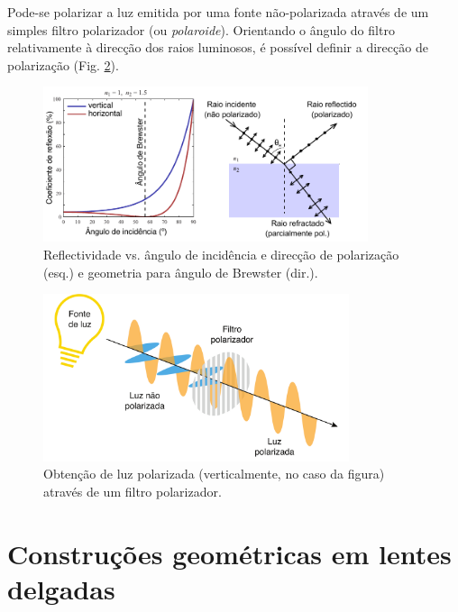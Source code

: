 \documentclass[a4paper,twoside,11pt]{report}      %
\begin{document}
Pode-se polarizar a luz emitida por uma fonte não-polarizada através de um simples filtro polarizador (ou \textit{polaroide}). Orientando o ângulo do filtro relativamente à direcção dos raios luminosos, é possível definir a direcção de polarização (Fig. \ref{fig:pol-luz}).

\begin{figure}[h]
\begin{center}
	\includegraphics[width=0.85\textwidth]{2-brewster}
	\caption{Reflectividade vs. ângulo de incidência e direcção de polarização (esq.) e geometria para ângulo de Brewster (dir.). \label{fig:brewster}} 
\end{center}
\end{figure}

\begin{figure}[t]
\centering 
	\includegraphics[width=0.8\textwidth]{2-pol-luz}
	\caption{Obtenção de luz polarizada (verticalmente, no caso da figura) através de um filtro polarizador. \label{fig:pol-luz}} 
\end{figure}






\section{\sf Construções geométricas em lentes delgadas}
\end{document}
